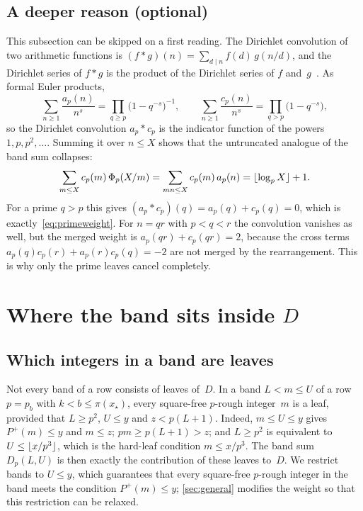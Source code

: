 \documentclass[11pt,a4paper]{amsart}
\numberwithin{equation}{section}
\DeclarePairedDelimiter{\floor}{\lfloor}{\rfloor}
\newcommand{\Pplus}{P^{+}}
\begin{document}
\subsection{A deeper reason (optional)}\label{sec:deeper}
This subsection can be skipped on a first reading. The Dirichlet convolution of
two arithmetic functions is $(f*g)(n)=\sum_{d\mid n}f(d)\,g(n/d)$, and the
Dirichlet series of $f*g$ is the product of the Dirichlet series of $f$
and~$g$~\cite[Ch.~2 and~11]{Apostol1976}. As formal Euler products,
\[
  \sum_{n\ge1}\frac{a_p(n)}{n^s}=\prod_{q\ge p}\bigl(1-q^{-s}\bigr)^{-1},\qquad
  \sum_{n\ge1}\frac{c_p(n)}{n^s}=\prod_{q>p}\bigl(1-q^{-s}\bigr),
\]
so the Dirichlet convolution $a_p*c_p$ is the indicator function of the powers
$1,p,p^2,\dots$. Summing it over $n\le X$ shows that the untruncated analogue
of the band sum collapses:
\[
  \sum_{m\le X}c_p(m)\,\Phi_p(X/m)=\sum_{mn\le X}c_p(m)\,a_p(n)
  =\floor{\log_p X}+1.
\] For a prime $q>p$ this gives
$(a_p*c_p)(q)=a_p(q)+c_p(q)=0$, which is exactly~\eqref{eq:primeweight}. For
$n=qr$ with $p<q<r$ the convolution vanishes as well, but the merged weight is
$a_p(qr)+c_p(qr)=2$, because the cross terms $a_p(q)c_p(r)+a_p(r)c_p(q)=-2$ are
not merged by the rearrangement. This is why only the prime leaves cancel
completely.

\section{Where the band sits inside \texorpdfstring{$D$}{D}}\label{sec:gourdon}

\subsection{Which integers in a band are leaves}
Not every band of a row consists of leaves of~$D$. In a band $L<m\le U$ of a
row $p=p_b$ with $k<b\le\pi(x_\star)$, every square-free $p$-rough integer~$m$ is a leaf, provided that
$L\ge p^2$, $U\le y$ and $z<p(L+1)$. Indeed,
$m\le U\le y$ gives $\Pplus(m)\le y$ and $m\le z$; $pm\ge p(L+1)>z$; and
$L\ge p^2$ is equivalent to $U\le\floor{x/p^3}$, which is the hard-leaf
condition $m\le x/p^3$. The band sum $D_p(L,U)$ is then exactly the
contribution of these leaves to~$D$. We restrict bands to $U\le y$,
which guarantees that every square-free $p$-rough integer in the band meets the
condition $\Pplus(m)\le y$; \cref{sec:general} modifies the weight so that this
restriction can be relaxed.
\end{document}
